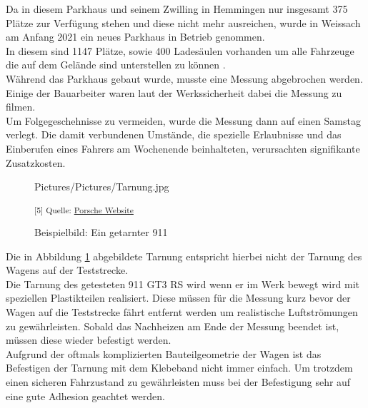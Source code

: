 Da in diesem Parkhaus und seinem Zwilling in Hemmingen nur insgesamt 375 Plätze zur Verfügung stehen und diese nicht mehr ausreichen, wurde in Weissach am Anfang 2021 ein neues Parkhaus in Betrieb genommen. \\
In diesem sind 1147 Plätze, sowie 400 Ladesäulen vorhanden um alle Fahrzeuge die auf dem Gelände sind unterstellen zu können \cite{PTPark}. \\

Während das Parkhaus gebaut wurde, musste eine Messung abgebrochen werden. Einige der Bauarbeiter waren laut der Werkssicherheit dabei die Messung zu filmen. \\
Um Folgegeschehnisse zu vermeiden, wurde die Messung dann auf einen Samstag verlegt. Die damit verbundenen Umstände, die spezielle Erlaubnisse und das Einberufen eines Fahrers am Wochenende beinhalteten, verursachten signifikante Zusatzkosten. \\

\begin{figure}[H]
	\begin{center}
		\begin{overpic}[width=\linewidth]{Pictures/Pictures/Tarnung.jpg}
			
		\end{overpic}
		
		\label{Tarnung}
		\caption{Beispielbild: Ein getarnter 911}
		\small\textsuperscript{[5] Quelle: \href{https://presse.porsche.de/prod/presse_pag/PressResources.nsf/Content?ReadForm&languageversionid=832808&hl=christophorus-385-dynamic-bastion-of-stability}{Porsche Website}}
	\end{center}
\end{figure} 

Die in Abbildung \ref{Tarnung} abgebildete Tarnung entspricht hierbei nicht der Tarnung des Wagens auf der Teststrecke. \\
Die Tarnung des getesteten 911 GT3 RS wird wenn er im Werk bewegt wird mit speziellen Plastikteilen realisiert. Diese müssen für die Messung kurz bevor der Wagen auf die Teststrecke fährt entfernt werden um realistische Luftströmungen zu gewährleisten. Sobald das Nachheizen am Ende der Messung beendet ist, müssen diese wieder befestigt werden.\\

Aufgrund der oftmals komplizierten Bauteilgeometrie der Wagen ist das Befestigen der Tarnung mit dem Klebeband nicht immer einfach. Um trotzdem einen sicheren Fahrzustand zu gewährleisten muss bei der Befestigung sehr auf eine gute Adhesion geachtet werden.